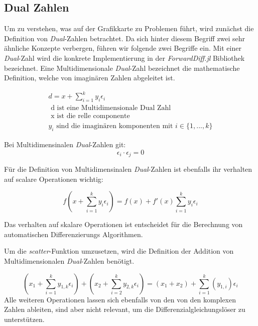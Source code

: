 \subsection{Dual Zahlen}

Um zu verstehen, was auf der Grafikkarte zu Problemen führt, 
wird zunächst die Definition von \textit{Dual}-Zahlen betrachtet.
Da sich hinter diesem Begriff zwei sehr ähnliche Konzepte verbergen, 
führen wir folgende zwei Begriffe ein.
Mit einer \textit{Dual}-Zahl wird die konkrete Implementierung in der \textit{ForwardDiff.jl} Bibliothek bezeichnet.
Eine Multidimensionale \textit{Dual}-Zahl bezeichnet die mathematische Definition, 
welche von imaginären Zahlen abgeleitet ist.

\begin{gather*}
 d = x + \sum_{i = 1}^{k} y_i \epsilon_i \\
	\text{ d ist eine Multidimensionale Dual Zahl } \\
	\text{ x ist die relle componente } \\
	y_i \text{ sind die imaginären komponenten mit } i \in \{1, ..., k\}
\end{gather*}

Bei Multidimensinalen \textit{Dual}-Zahlen git:
\begin{equation}
 \epsilon_i \cdot \epsilon_j = 0
\end{equation}

Für die Definition von Multidimensinalen \textit{Dual}-Zahlen \cite{juliaForwardDiffPackage}
ist ebenfalls ihr verhalten auf scalare Operationen wichtig:

\begin{equation}
 f( x + \sum_{i = 1}^{k} y_i \epsilon_i  ) = f(x) +  f'(x) \sum_{i = 1}^{k} y_i \epsilon_i
\end{equation}

Das verhalten auf skalare Operationen ist entscheidet 
für die Berechnung von automatischen Differenzierungs Algorithmen.

Um die \textit{scatter}-Funktion umzusetzen, 
wird die Definition der Addition von Multidimensionalen \textit{Dual}-Zahlen \cite{RecentAdvances} benötigt.

\begin{equation}
(x_1 + \sum_{i = 1}^{k} y_{1,k} \epsilon_i) + ( x_2 + \sum_{i = 2}^{k} y_{2,k} \epsilon_i) = (x_1 + x_2) + \sum_{i = 1}^{k} (y_{1, i}) \epsilon_i
\end{equation}
Alle weiteren Operationen lassen sich ebenfalls von den von den komplexen Zahlen ableiten, 
sind aber nicht relevant, um die Differenzialgleichungslöser zu unterstützen.
